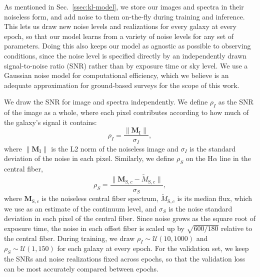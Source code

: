 As mentioned in Sec.~\ref{ssec:kl-model}, we store our images and spectra in their noiseless form, and add noise to them on-the-fly during training and inference. This lets us draw new noise levels and realizations for every galaxy at every epoch, so that our model learns from a variety of noise levels for any set of parameters. Doing this also keeps our model as agnostic  as possible to observing conditions, since the noise level is specified directly by an independently drawn signal-to-noise ratio (SNR) rather than by exposure time or sky level. We use a Gaussian noise model for computational efficiency, which we believe is an adequate approximation for ground-based surveys for the scope of this work.

We draw the SNR for image and spectra independently. We define $\rho_I$ as the SNR of the image as a whole, where each pixel contributes according to how much of the galaxy's signal it contains:
\begin{equation}
\label{eqn:snr-image}
    \rho_I = \frac{\lVert \bm{M}_\mathrm{I} \rVert}{\sigma_I},
\end{equation}
where $\lVert \bm{M}_\mathrm{I} \rVert$ is the L2 norm of the noiseless image and $\sigma_I$ is the standard deviation of the noise in each pixel. Similarly, we define $\rho_S$ on the H$\alpha$ line in the central fiber,
\begin{equation}
\label{eqn:snr-spec}
    \rho_S = \frac{\lVert \bm{M}_{\mathrm{S},c} - \tilde{M}_{\mathrm{S},c} \rVert}{\sigma_S},
\end{equation}
where $\bm{M}_{\mathrm{S},c}$ is the noiseless central fiber spectrum, $\tilde{M}_{\mathrm{S},c}$ is its median flux, which we use as an estimate of the continuum level, and $\sigma_S$ is the noise standard deviation in each pixel of the central fiber. Since noise grows as the square root of exposure time, the noise in each offset fiber is scaled up by $\sqrt{600/180}$ relative to the central fiber. During training, we draw $\rho_I \sim \mathcal{U}(10, 1000)$ and $\rho_S \sim \mathcal{U}(1, 150)$ for each galaxy at every epoch. For the validation set, we keep the SNRs and noise realizations fixed across epochs, so that the validation loss can be most accurately compared between epochs.

